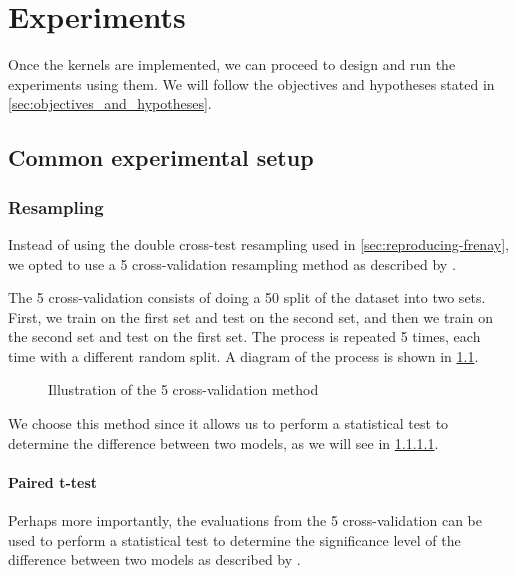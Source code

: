 \chapter{Experiments}
\label{sec:experiments}

Once the kernels are implemented, we can proceed to design and run the
experiments using them. We will follow the objectives and hypotheses stated in
\cref{sec:objectives_and_hypotheses}.

\section{Common experimental setup}

\subsection{Resampling}
\label{sec:resampling}

Instead of using the double cross-test resampling used in
\cref{sec:reproducing-frenay}, we opted to use a 5 cross-validation
resampling method as described by
\textcite{dietterichApproximateStatisticalTests1998}.

The 5 cross-validation consists of doing a 50 split of
the dataset into two sets. First, we train on the first set and test on the
second set, and then we train on the second set and test on the first set. The
process is repeated 5 times, each time with a different random split. A diagram
of the process is shown in \cref{fig:5x2CV}.

\begin{figure}[H]
    
    \caption{Illustration of the 5 cross-validation method}%
    \label{fig:5x2CV}
\end{figure}

We choose
this method since it allows us to perform a statistical test to determine
the difference between two models, as we will see in \cref{sec:paired-t-test}.


\subsubsection{Paired t-test}%
\label{sec:paired-t-test}

Perhaps more importantly, the evaluations from the 5 cross-validation
can be used to perform a statistical test to determine the significance level
of the difference between two models as described by \textcite{dietterichApproximateStatisticalTests1998}.

